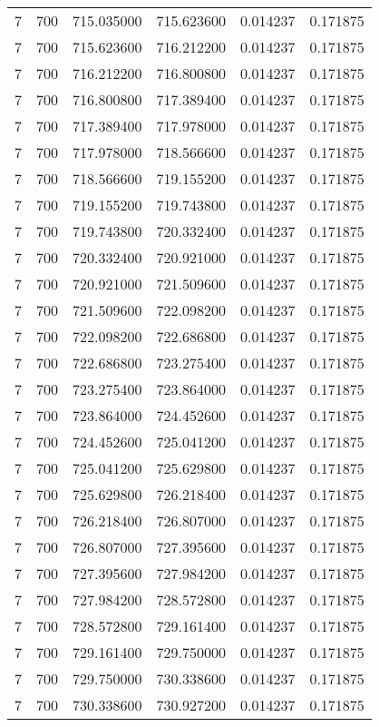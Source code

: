 \begin{longtable}{rrrrrr}
7 & 700 & 715.035000 & 715.623600 & 0.014237 & 0.171875 \\
7 & 700 & 715.623600 & 716.212200 & 0.014237 & 0.171875 \\
7 & 700 & 716.212200 & 716.800800 & 0.014237 & 0.171875 \\
7 & 700 & 716.800800 & 717.389400 & 0.014237 & 0.171875 \\
7 & 700 & 717.389400 & 717.978000 & 0.014237 & 0.171875 \\
7 & 700 & 717.978000 & 718.566600 & 0.014237 & 0.171875 \\
7 & 700 & 718.566600 & 719.155200 & 0.014237 & 0.171875 \\
7 & 700 & 719.155200 & 719.743800 & 0.014237 & 0.171875 \\
7 & 700 & 719.743800 & 720.332400 & 0.014237 & 0.171875 \\
7 & 700 & 720.332400 & 720.921000 & 0.014237 & 0.171875 \\
7 & 700 & 720.921000 & 721.509600 & 0.014237 & 0.171875 \\
7 & 700 & 721.509600 & 722.098200 & 0.014237 & 0.171875 \\
7 & 700 & 722.098200 & 722.686800 & 0.014237 & 0.171875 \\
7 & 700 & 722.686800 & 723.275400 & 0.014237 & 0.171875 \\
7 & 700 & 723.275400 & 723.864000 & 0.014237 & 0.171875 \\
7 & 700 & 723.864000 & 724.452600 & 0.014237 & 0.171875 \\
7 & 700 & 724.452600 & 725.041200 & 0.014237 & 0.171875 \\
7 & 700 & 725.041200 & 725.629800 & 0.014237 & 0.171875 \\
7 & 700 & 725.629800 & 726.218400 & 0.014237 & 0.171875 \\
7 & 700 & 726.218400 & 726.807000 & 0.014237 & 0.171875 \\
7 & 700 & 726.807000 & 727.395600 & 0.014237 & 0.171875 \\
7 & 700 & 727.395600 & 727.984200 & 0.014237 & 0.171875 \\
7 & 700 & 727.984200 & 728.572800 & 0.014237 & 0.171875 \\
7 & 700 & 728.572800 & 729.161400 & 0.014237 & 0.171875 \\
7 & 700 & 729.161400 & 729.750000 & 0.014237 & 0.171875 \\
7 & 700 & 729.750000 & 730.338600 & 0.014237 & 0.171875 \\
7 & 700 & 730.338600 & 730.927200 & 0.014237 & 0.171875 \\

\end{longtable}
